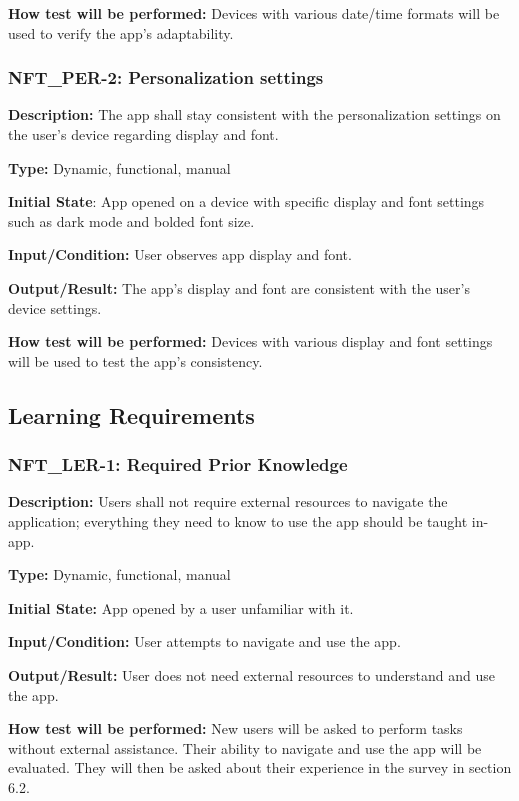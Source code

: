 \documentclass[12pt, titlepage]{article}
\begin{document}
\textbf{How test will be performed:} Devices with various date/time formats will be used to verify the app's adaptability.


\subsubsection*{\textbf{NFT\_PER-2: Personalization settings}
}

\textbf{Description: }The app shall stay consistent with the personalization settings on the user’s device regarding display and font.

\textbf{Type:} Dynamic, functional, manual

\textbf{Initial State}: App opened on a device with specific display and font settings such as dark mode and bolded font size.

\textbf{Input/Condition: }User observes app display and font.

\textbf{Output/Result:} The app's display and font are consistent with the user’s device settings.

\textbf{How test will be performed:} Devices with various display and font settings will be used to test the app's consistency.
\newline
\subsection{Learning Requirements}


\subsubsection*{\textbf{NFT\_LER-1: Required Prior Knowledge}
}

\textbf{Description: }Users shall not require external resources to navigate the application; everything they need to know to use the app should be taught in-app.

\textbf{Type:} Dynamic, functional, manual

\textbf{Initial State:} App opened by a user unfamiliar with it.

\textbf{Input/Condition: }User attempts to navigate and use the app.

\textbf{Output/Result:} User does not need external resources to understand and use the app.

\textbf{How test will be performed:} New users will be asked to perform tasks without external assistance. Their ability to navigate and use the app will be evaluated. They will then be asked about their experience in the survey in section 6.2. 
\newline
\end{document}
